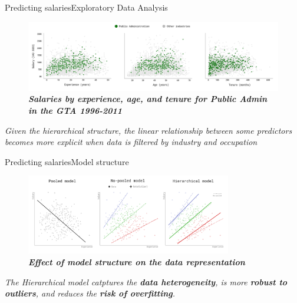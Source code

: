 \documentclass[aspectratio=169, xcolor=dvipsnames]{beamer}
\begin{document}
\begin{frame}{Predicting salaries}{Exploratory Data Analysis}
    \vspace*{-30pt}
    \begin{figure}
        \centering
        \includegraphics[width=1.0\textwidth]{./images/eda_salary_ind.png}
        \captionsetup{labelformat=empty}
        \setlength{\abovecaptionskip}{-10pt}
        \caption{\fontsize{8pt}{8pt}\selectfont \textbf{\textit{Salaries by experience, age, and tenure for Public Admin in the GTA 1996-2011}}}
    \end{figure}
    \centering \textit{Given the hierarchical structure, the linear relationship between some predictors becomes more explicit when data is filtered by industry and occupation}
\end{frame} 

\begin{frame}{Predicting salaries}{Model structure}
    \vspace*{-16pt}
    \begin{figure}
        \centering
        \includegraphics[width=0.8\textwidth]{./images/simpsons_paradox.png}
        \captionsetup{labelformat=empty}
        \setlength{\abovecaptionskip}{-7pt}
        \caption{\fontsize{8pt}{8pt}\selectfont \textbf{\textit{Effect of model structure on the data representation}}}
    \end{figure}
    \centering \textit{The Hierarchical model catptures the \textbf{data heterogeneity}, is more \textbf{robust to outliers}, and reduces the \textbf{risk of overfitting}.}
\end{frame}
\end{document}

